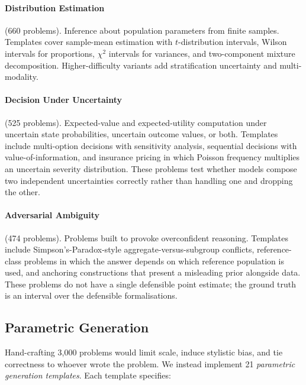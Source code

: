 \documentclass{article}
\begin{document}
\paragraph{Distribution Estimation} (660 problems). Inference about population parameters from finite samples. Templates cover sample-mean estimation with $t$-distribution intervals, Wilson intervals for proportions, $\chi^2$ intervals for variances, and two-component mixture decomposition. Higher-difficulty variants add stratification uncertainty and multi-modality.

\paragraph{Decision Under Uncertainty} (525 problems). Expected-value and expected-utility computation under uncertain state probabilities, uncertain outcome values, or both. Templates include multi-option decisions with sensitivity analysis, sequential decisions with value-of-information, and insurance pricing in which Poisson frequency multiplies an uncertain severity distribution. These problems test whether models compose two independent uncertainties correctly rather than handling one and dropping the other.

\paragraph{Adversarial Ambiguity} (474 problems). Problems built to provoke overconfident reasoning. Templates include Simpson's-Paradox-style aggregate-versus-subgroup conflicts, reference-class problems in which the answer depends on which reference population is used, and anchoring constructions that present a misleading prior alongside data. These problems do not have a single defensible point estimate; the ground truth is an interval over the defensible formalisations.

\subsection{Parametric Generation}
\label{sec:generation}

Hand-crafting 3{,}000 problems would limit scale, induce stylistic bias, and tie correctness to whoever wrote the problem. We instead implement 21 \emph{parametric generation templates}. Each template specifies:
\end{document}
